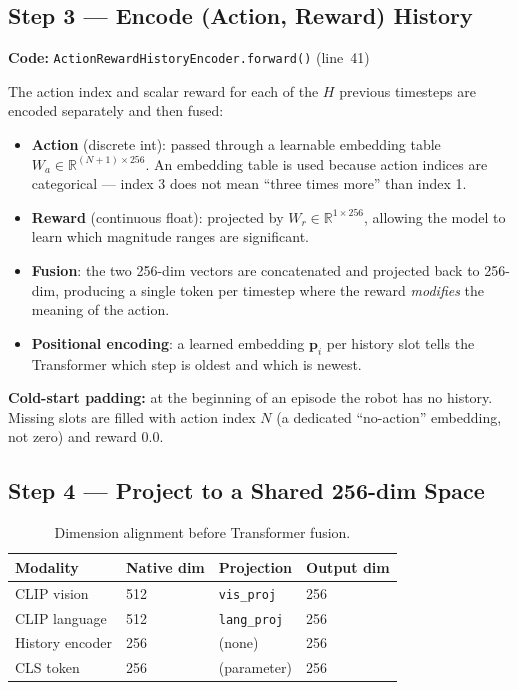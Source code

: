\documentclass[12pt, a4paper]{article}
\begin{document}
\subsection{Step 3 — Encode (Action, Reward) History}
\label{sec:step3}

\textbf{Code:} \texttt{ActionRewardHistoryEncoder.forward()} (line~41)

The action index and scalar reward for each of the $H$ previous timesteps
are encoded separately and then fused:

\begin{itemize}[leftmargin=1.5em]
  \item \textbf{Action} (discrete int): passed through a learnable embedding
        table $W_a \in \mathbb{R}^{(N+1)\times256}$.
        An embedding table is used because action indices are categorical —
        index 3 does not mean ``three times more'' than index 1.
  \item \textbf{Reward} (continuous float): projected by
        $W_r \in \mathbb{R}^{1\times256}$, allowing the model to learn
        which magnitude ranges are significant.
  \item \textbf{Fusion}: the two 256-dim vectors are concatenated and
        projected back to 256-dim, producing a single token per timestep
        where the reward \emph{modifies} the meaning of the action.
  \item \textbf{Positional encoding}: a learned embedding $\mathbf{p}_i$
        per history slot tells the Transformer which step is oldest and which
        is newest.
\end{itemize}

\textbf{Cold-start padding:} at the beginning of an episode the robot has
no history.
Missing slots are filled with action index $N$ (a dedicated ``no-action''
embedding, not zero) and reward $0.0$.

\subsection{Step 4 — Project to a Shared 256-dim Space}
\label{sec:step4}

\begin{table}[h]
\centering
\caption{Dimension alignment before Transformer fusion.}
\begin{tabular}{L{4cm} C{3cm} C{2cm} C{3cm}}
\toprule
\textbf{Modality} & \textbf{Native dim} & \textbf{Projection} & \textbf{Output dim} \\
\midrule
CLIP vision      & 512 & \texttt{vis\_proj}  & 256 \\
CLIP language    & 512 & \texttt{lang\_proj} & 256 \\
History encoder  & 256 & (none)              & 256 \\
CLS token        & 256 & (parameter)         & 256 \\
\bottomrule
\end{tabular}
\end{table}
\end{document}
